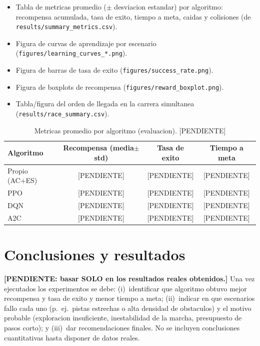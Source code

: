 \documentclass[conference]{IEEEtran}
\begin{document}
\begin{itemize}
  \item Tabla de metricas promedio ($\pm$ desviacion estandar) por algoritmo:
  recompensa acumulada, tasa de exito, tiempo a meta, caidas y colisiones
  (de \texttt{results/summary\_metrics.csv}).
  \item Figura de curvas de aprendizaje por escenario
  (\texttt{figures/learning\_curves\_*.png}).
  \item Figura de barras de tasa de exito (\texttt{figures/success\_rate.png}).
  \item Figura de boxplots de recompensa (\texttt{figures/reward\_boxplot.png}).
  \item Tabla/figura del orden de llegada en la carrera simultanea
  (\texttt{results/race\_summary.csv}).
\end{itemize}

\begin{table}[t]
\caption{Metricas promedio por algoritmo (evaluacion). [PENDIENTE]}
\label{tab:results}
\centering
\small
\begin{tabular}{@{}lccc@{}}
\toprule
Algoritmo & Recompensa (media$\pm$std) & Tasa de exito & Tiempo a meta \\
\midrule
Propio (AC+ES) & [PENDIENTE] & [PENDIENTE] & [PENDIENTE] \\
PPO & [PENDIENTE] & [PENDIENTE] & [PENDIENTE] \\
DQN & [PENDIENTE] & [PENDIENTE] & [PENDIENTE] \\
A2C & [PENDIENTE] & [PENDIENTE] & [PENDIENTE] \\
\bottomrule
\end{tabular}
\end{table}

\section{Conclusiones y resultados}
\textbf{[PENDIENTE: basar SOLO en los resultados reales obtenidos.]} Una vez
ejecutados los experimentos se debe: (i)~identificar que algoritmo obtuvo mejor
recompensa y tasa de exito y menor tiempo a meta; (ii)~indicar en que escenarios
fallo cada uno (p.\ ej.\ pistas estrechas o alta densidad de obstaculos) y el
motivo probable (exploracion insuficiente, inestabilidad de la marcha,
presupuesto de pasos corto); y (iii)~dar recomendaciones finales. No se incluyen
conclusiones cuantitativas hasta disponer de datos reales.
\end{document}

